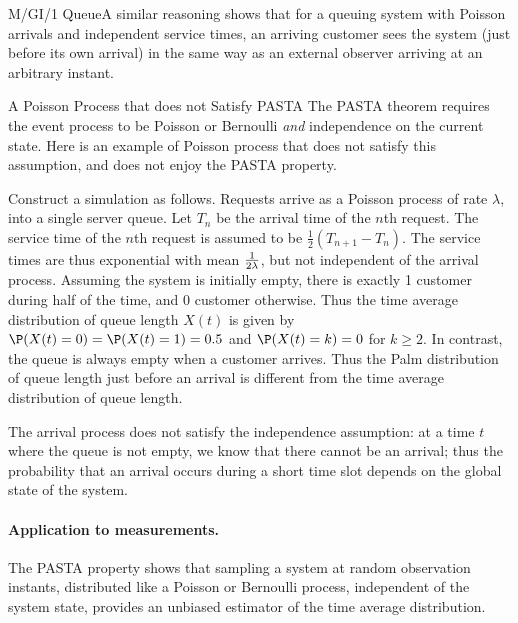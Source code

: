 \begin{ex}
{M/GI/1 Queue}A similar reasoning shows that for
a queuing system with Poisson arrivals and
independent service times, an arriving customer
sees the system (just before its own arrival) in
the same way as an external observer arriving at
an arbitrary instant.\label{ex-mg1-pasta}
\end{ex}
\begin{ex}
{A Poisson Process that does not Satisfy PASTA} The PASTA
theorem requires the event process to be Poisson or Bernoulli
\emph{and} independence on the current state. Here is an
example of Poisson process that does not satisfy this
assumption, and does not enjoy the PASTA property.

Construct a simulation as follows. Requests arrive as a Poisson
process of rate $\lambda$, into a single server queue. Let $T_n$ be
the arrival time of the $n$th request. The service time of the $n$th
request is assumed to be $\frac{1}{2}(T_{n+1}-T_n)$. The service
times are thus exponential with mean $1 \over 2 \lambda$, but not
independent of the arrival process. Assuming the system is initially
empty, there is exactly 1 customer during half of the time, and 0
customer otherwise. Thus the time average distribution of queue
length $X(t)$ is given by $\P(X(t)=0)=\P(X(t)=1)=0.5$ and
$\P(X(t)=k)=0$ for $k\geq 2$. In contrast, the queue is always empty
when a customer arrives. Thus the Palm distribution of queue length
just before an arrival is different from the time average
distribution of queue length.

The arrival process does not satisfy the independence
assumption: at a time $t$ where the queue is not empty, we know
that there cannot be an arrival; thus the probability that an
arrival occurs during a short time slot depends on the global
state of the system.\label{ex-non-pasta}
\end{ex}


\paragraph{Application to measurements.} The PASTA property shows that sampling
a system at random observation instants, distributed like a
Poisson or Bernoulli process, independent of the system state,
provides an unbiased estimator of the time average
distribution.


%
%
%
%
%
%
%
%

